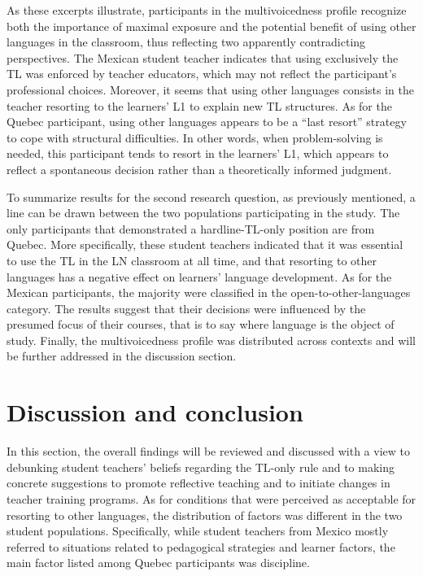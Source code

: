 \documentclass[output=paper]{../langscibook}
\begin{document}
As these excerpts illustrate, participants in the multivoicedness profile recognize both the importance of maximal exposure and the potential benefit of using other languages in the classroom, thus reflecting two apparently contradicting perspectives. The Mexican student teacher indicates that using exclusively the TL was enforced by teacher educators, which may not reflect the participant’s professional choices. Moreover, it seems that using other languages consists in the teacher resorting to the learners’ L1 to explain new TL structures. As for the Quebec participant, using other languages appears to be a ``last resort'' strategy to cope with structural difficulties. In other words, when problem-solving is needed, this participant tends to resort in the learners’ L1, which appears to reflect a spontaneous decision rather than a theoretically informed judgment.  

To summarize results for the second research question, as previously mentioned, a line can be drawn between the two populations participating in the study. The only participants that demonstrated a hardline-TL{}-only position are from Quebec. More specifically, these student teachers indicated that it was essen\-tial to use the TL in the LN classroom at all time, and that resorting to other languages has a negative effect on learners’ language development. As for the Mexican participants, the majority were classified in the open-to-other-languages category. The results suggest that their decisions were influenced by the presumed focus of their courses, that is to say where language is the object of study. Finally, the multivoicedness profile was distributed across contexts and will be further addressed in the discussion section. 


\section{Discussion and conclusion}


In this section, the overall findings will be reviewed and discussed with a view to debunking student teachers’ beliefs regarding the TL-only rule and to making concrete suggestions to promote reflective teaching and to initiate changes in teacher training programs. As for conditions that were perceived as acceptable for resorting to other languages, the distribution of factors was different in the two student populations. Specifically, while student teachers from Mexico mostly referred to situations related to pedagogical strategies and learner factors, the main factor listed among Quebec participants was discipline. 
\end{document}
